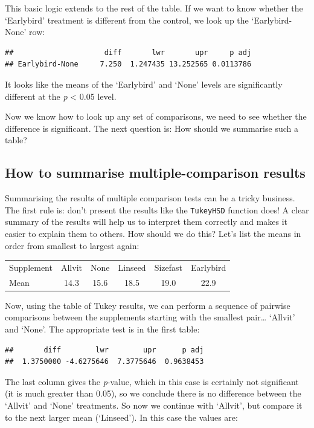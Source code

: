 \documentclass[
]{book}
\begin{document}
This basic logic extends to the rest of the table. If we want to know whether the `Earlybird' treatment is different from the control, we look up the `Earlybird-None' row:

\begin{verbatim}
##                     diff       lwr       upr     p adj 
## Earlybird-None     7.250  1.247435 13.252565 0.0113786
\end{verbatim}

It looks like the means of the `Earlybird' and `None' levels are significantly different at the \emph{p} \textless{} 0.05 level.

Now we know how to look up any set of comparisons, we need to see whether the difference is significant. The next question is: How should we summarise such a table?

\hypertarget{how-to-summarise-multiple-comparison-results}{%
\subsection{How to summarise multiple-comparison results}\label{how-to-summarise-multiple-comparison-results}}

Summarising the results of multiple comparison tests can be a tricky business. The first rule is: don't present the results like the \texttt{TukeyHSD} function does! A clear summary of the results will help us to interpret them correctly and makes it easier to explain them to others. How should we do this? Let's list the means in order from smallest to largest again:

\begin{longtable}[]{@{}lccccc@{}}
\toprule()
\endhead
Supplement & Allvit & None & Linseed & Sizefast & Earlybird \\
Mean & 14.3 & 15.6 & 18.5 & 19.0 & 22.9 \\
\bottomrule()
\end{longtable}

Now, using the table of Tukey results, we can perform a sequence of pairwise comparisons between the supplements starting with the smallest pair\ldots{} `Allvit' and `None'. The appropriate test is in the first table:

\begin{verbatim}
##       diff        lwr        upr      p adj 
##  1.3750000 -4.6275646  7.3775646  0.9638453
\end{verbatim}

The last column gives the \emph{p}-value, which in this case is certainly not significant (it is much greater than 0.05), so we conclude there is no difference between the `Allvit' and `None' treatments. So now we continue with `Allvit', but compare it to the next larger mean (`Linseed'). In this case the values are:
\end{document}
